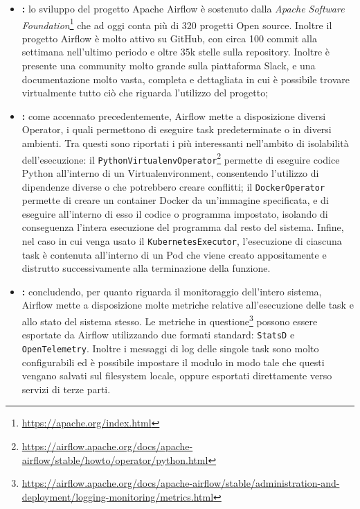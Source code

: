 \begin{itemize}
  \item \textbf{:} lo sviluppo del progetto Apache
    Airflow è sostenuto dalla \textit{Apache Software Foundation}\footnote{\url{https://apache.org/index.html}}
    che ad oggi conta più di 320 progetti Open source. Inoltre il progetto Airflow
    è molto attivo su GitHub, con circa 100 commit alla settimana nell'ultimo
    periodo e oltre 35k stelle sulla repository. Inoltre è presente una community
    molto grande sulla piattaforma Slack, e una documentazione molto vasta, completa
    e dettagliata in cui è possibile trovare virtualmente tutto ciò che riguarda
    l'utilizzo del progetto;

  \item \textbf{:} come accennato precedentemente, Airflow
    mette a disposizione diversi Operator, i quali permettono di eseguire task
    predeterminate o in diversi ambienti. Tra questi sono riportati i più interessanti
    nell'ambito di isolabilità dell'esecuzione: il \texttt{PythonVirtualenvOperator}\footnote{\url{https://airflow.apache.org/docs/apache-airflow/stable/howto/operator/python.html}}
    permette di eseguire codice Python all'interno di un Virtualenvironment, consentendo
    l'utilizzo di dipendenze diverse o che potrebbero creare conflitti; il
    \texttt{DockerOperator} permette di creare un container Docker da un'immagine
    specificata, e di eseguire all'interno di esso il codice o programma
    impostato, isolando di conseguenza l'intera esecuzione del programma dal resto
    del sistema. Infine, nel caso in cui venga usato il \texttt{KubernetesExecutor},
    l'esecuzione di ciascuna task è contenuta all'interno di un Pod che viene creato
    appositamente e distrutto successivamente alla terminazione della funzione.

  \item \textbf{:} concludendo, per quanto riguarda il monitoraggio
    dell'intero sistema, Airflow mette a disposizione molte metriche relative
    all'esecuzione delle task e allo stato del sistema stesso. Le metriche in questione\footnote{\url{https://airflow.apache.org/docs/apache-airflow/stable/administration-and-deployment/logging-monitoring/metrics.html}}
    possono essere esportate da Airflow utilizzando due formati standard: \texttt{StatsD}
    e \texttt{OpenTelemetry}. Inoltre i messaggi di log delle singole task sono
    molto configurabili ed è possibile impostare il modulo in modo tale che
    questi vengano salvati sul filesystem locale, oppure esportati direttamente verso
    servizi di terze parti.
\end{itemize}